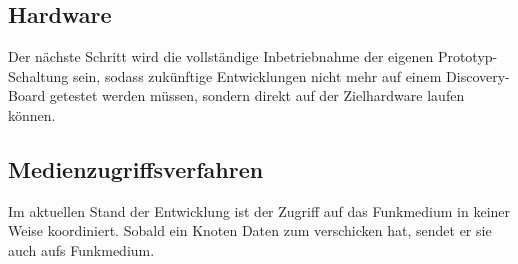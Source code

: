 \documentclass{IEEEtran}
\begin{document}
    \subsection{Hardware}
        Der nächste Schritt wird die vollständige Inbetriebnahme der eigenen
        Prototyp-Schaltung sein, sodass zukünftige Entwicklungen nicht mehr
        auf einem Discovery-Board getestet werden müssen, sondern direkt auf
        der Zielhardware laufen können.

    \subsection{Medienzugriffsverfahren}
    Im aktuellen Stand der Entwicklung ist der Zugriff auf das Funkmedium in 
    keiner Weise koordiniert. Sobald ein Knoten Daten zum verschicken hat, 
    sendet er sie auch aufs Funkmedium. 
\end{document}

